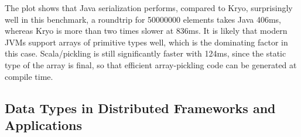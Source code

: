 The plot shows that Java serialization performs, compared to Kryo, surprisingly well in this benchmark, \eg a roundtrip for 50000000 elements takes Java 406ms, whereas Kryo is more than two times slower at 836ms. It is likely that modern JVMs support arrays of primitive types well, which is the dominating factor in this case. Scala/pickling is still significantly faster with 124ms, since the static type of the array is final, so that efficient array-pickling code can be generated at compile time.

\subsection{Data Types in Distributed Frameworks and Applications}
\label{sec:data-types-in-distributed-applications}



